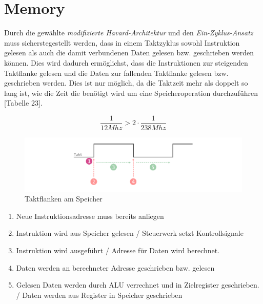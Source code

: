     \section{Memory}\label{lab:memory}

        Durch die gewählte \textit{modifizierte Havard-Architektur} und den \textit{Ein-Zyklus-Ansatz}
        muss sicherstegestellt werden, dass in einem Taktzyklus sowohl Instruktion gelesen als auch die damit verbundenen Daten
        gelesen bzw. geschrieben werden können. Dies wird dadurch ermöglichst, dass die Instruktionen zur steigenden Taktflanke
        gelesen und die Daten zur fallenden Taktflanke gelesen bzw. geschrieben werden.
        Dies ist nur möglich, da die Taktzeit mehr als doppelt so lang ist, wie die Zeit die benötigt wird um eine Speicheroperation
        durchzuführen \cite{intel-cyc10lp-device-datasheet}[Tabelle 23].

        \begin{equation}
            \frac{1}{12Mhz} > 2\cdot\frac{1}{238Mhz}
        \end{equation}


        \begin{figure}[H]
            \centering
            \includegraphics[scale=1]{img/Timing_Memory.pdf}
            \caption{Taktflanken am Speicher}
            \label{fig:timing_memory}
        \end{figure}

         \begin{enumerate}
             \item Neue Instruktionsadresse muss bereits anliegen
             \item Instruktion wird aus Speicher gelesen / Steuerwerk setzt Kontrollsignale
             \item Instruktion wird ausgeführt / Adresse für Daten wird berechnet.
             \item Daten werden an berechneter Adresse geschrieben bzw. gelesen
             \item Gelesen Daten werden durch ALU verrechnet und in Zielregister geschrieben. / Daten werden aus Register in Speicher geschrieben
         \end{enumerate}

